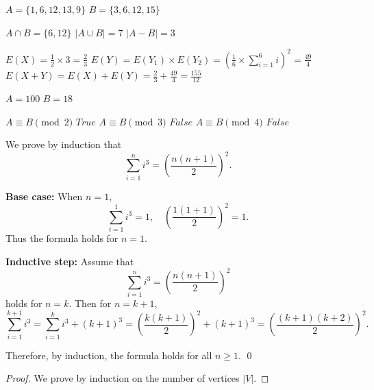 \documentclass[12pt,twoside]{article}
\begin{document}

\begin{problems}

\problem  %
$A = \{1,6,12,13,9\}$
$B = \{3,6,12,15\}$
\begin{problemparts}
\problempart %
$A \cap B = \{6,12\}$
\problempart %
$|A \cup B| = 7$
\problempart %
$|A - B| = 3$
\end{problemparts}

\problem  %
\begin{problemparts}
\problempart %
$E(X)=\frac{1}{2} \times 3 =\frac{2}{3}$
\problempart %
$E(Y)=E(Y_1)\times E(Y_2)=(\frac{1}{6} \times \sum\limits_{i=1}^{6} i )^2= \frac{49}{4}$
\problempart %
$E(X+Y)=E(X)+E(Y)=\frac{2}{3}+\frac{49}{4}=\frac{155}{12}$
\end{problemparts}

\problem  %
$A = 100$
$B = 18$
\begin{problemparts}
\problempart %
$A \equiv B \pmod{2}$ $True$
\problempart %
$A \equiv B \pmod{3}$ $False$
\problempart %
$A \equiv B \pmod{4}$ $False$
\end{problemparts}

\problem  %
We prove by induction that
\[
\sum_{i=1}^{n} i^3 = \left( \frac{n(n+1)}{2} \right)^2 .
\]

\textbf{Base case:} When $n=1$,
\[
\sum_{i=1}^{1} i^3 = 1, \quad \left(\frac{1(1+1)}{2}\right)^2 = 1.
\]
Thus the formula holds for $n=1$.

\textbf{Inductive step:} Assume that
\[
\sum_{i=1}^{n} i^3 = \left(\frac{n(n+1)}{2}\right)^2
\]
holds for $n=k$. Then for $n=k+1$,
\[
\sum_{i=1}^{k+1} i^3
= \sum_{i=1}^{k} i^3 + (k+1)^3
= \left(\frac{k(k+1)}{2}\right)^2 + (k+1)^3
= \left(\frac{(k+1)(k+2)}{2}\right)^2 .
\]

Therefore, by induction, the formula holds for all $n \geq 1$. \qed

\problem  %
\begin{proof}
We prove by induction on the number of vertices $|V|$.  


\end{proof}
\end{problems}
\end{document}
